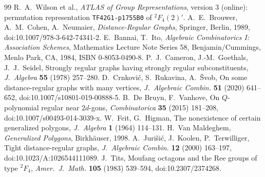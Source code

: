 \documentclass[11pt]{article}
\theoremstyle{remark}
\begin{document}
\begin{thebibliography}{99}
 R.~A.~Wilson et al., \emph{ATLAS of Group Representations}, version 3 (online): permutation representation \texttt{TF42G1-p1755B0} of ${}^2F_4(2)'$.
 A.~E.~Brouwer, A.~M.~Cohen, A.~Neumaier, \emph{Distance-Regular Graphs}, Springer, Berlin, 1989, doi:10.1007/978-3-642-74341-2.
 E.~Bannai, T.~Ito, \emph{Algebraic Combinatorics I: Association Schemes}, Mathematics Lecture Note Series 58, Benjamin/Cummings, Menlo Park, CA, 1984, ISBN 0-8053-0490-8.
 P.~J.~Cameron, J.-M.~Goethals, J.~J.~Seidel, Strongly regular graphs having strongly regular subconstituents, \emph{J.\ Algebra} \textbf{55} (1978) 257--280.
 D.~Crnkovi\'c, S.~Rukavina, A.~\v{S}vob, On some distance-regular graphs with many vertices, \emph{J.\ Algebraic Combin.} \textbf{51} (2020) 641--652, doi:10.1007/s10801-019-00888-5.
 B.~De Bruyn, F.~Vanhove, On $Q$-polynomial regular near $2d$-gons, \emph{Combinatorica} \textbf{35} (2015) 181--208, doi:10.1007/s00493-014-3039-x.
 W.~Feit, G.~Higman, The nonexistence of certain generalized polygons, \emph{J.\ Algebra} \textbf{1} (1964) 114--131.
 H.~Van Maldeghem, \emph{Generalized Polygons}, Birkh\"auser, 1998.
 A.~Juri\v{s}i\'c, J.~Koolen, P.~Terwilliger, Tight distance-regular graphs, \emph{J.\ Algebraic Combin.} \textbf{12} (2000) 163--197, doi:10.1023/A:1026544111089.
 J.~Tits, Moufang octagons and the Ree groups of type ${}^2F_4$, \emph{Amer.\ J.\ Math.} \textbf{105} (1983) 539--594, doi:10.2307/2374268.
\end{thebibliography}
\end{document}
